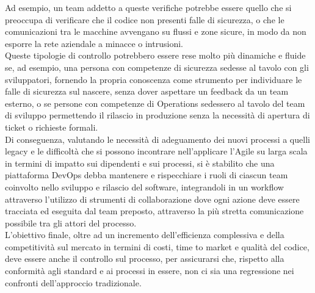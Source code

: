 \documentclass[a4paper, 12pt]{report}
\numberwithin{equation}{section}
\begin{document}
Ad esempio, un team addetto a queste verifiche potrebbe essere quello che si preoccupa di verificare che il codice non presenti falle di sicurezza, o che le comunicazioni tra le macchine avvengano su flussi e zone sicure, in modo da non esporre la rete aziendale a minacce o intrusioni. \\
Queste tipologie di controllo potrebbero essere rese molto più dinamiche e fluide se, ad esempio, una persona con competenze di sicurezza sedesse al tavolo con gli sviluppatori, fornendo la propria conoscenza come strumento per individuare le falle di sicurezza sul nascere, senza dover aspettare un feedback da un team esterno, o se persone con competenze di Operations sedessero al tavolo del team di sviluppo permettendo il rilascio in produzione senza la necessità di apertura di ticket o richieste formali.\\
Di conseguenza, valutando le necessità di adeguamento dei nuovi processi a quelli legacy e le difficoltà che si possono incontrare nell’applicare l’Agile su larga scala in termini di impatto sui dipendenti e sui processi, si è stabilito che una piattaforma DevOps debba mantenere e rispecchiare i ruoli di ciascun team coinvolto nello sviluppo e rilascio del software, integrandoli in un workflow attraverso l'utilizzo di strumenti di collaborazione dove ogni azione deve essere tracciata ed eseguita dal team preposto, attraverso la più stretta comunicazione possibile tra gli attori del processo.\\
L’obiettivo finale, oltre ad un incremento dell’efficienza complessiva e della competitività sul mercato in termini di costi, time to market e qualità del codice, deve essere anche il controllo sul processo, per assicurarsi che, rispetto alla conformità agli standard e ai processi in essere, non ci sia una regressione nei confronti dell’approccio tradizionale.
\end{document}
